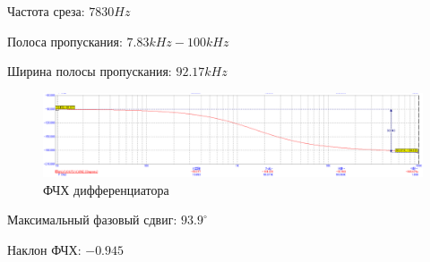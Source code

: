 \documentclass[a4paper,14pt]{article}
\begin{document}
Частота среза: $7830Hz$

Полоса пропускания: $7.83kHz - 100kHz$

Ширина полосы пропускания: $92.17kHz$

\begin{figure}[H]
	\centering
	\includegraphics[width=\linewidth]{../imgs/diff_pr}
	\caption{ФЧХ дифференциатора}
	\label{fig:diff_pr}
\end{figure}

Максимальный фазовый сдвиг: $93.9^{\circ}$

Наклон ФЧХ: $-0.945$
\end{document}

